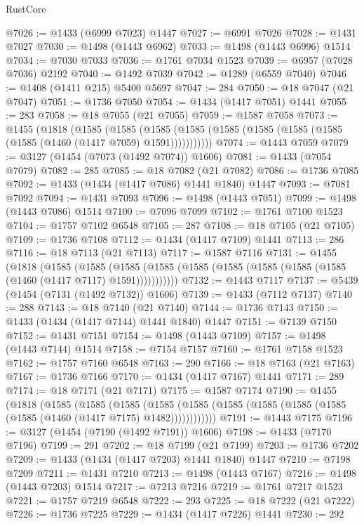 \begin{lexlean}{RustCore}
\begin{coremodule}
@7026 := @1433 (@6999 @7023) @1447
@7027 := @6991 @7026
@7028 := @1431 @7027
@7030 := @1498 (@1443 @6962)
@7033 := @1498 (@1443 @6996) @1514
@7034 := @7030 @7033
@7036 := @1761 @7034 @1523
@7039 := @6957 (@7028 @7036) @2192
@7040 := @1492 @7039
@7042 := @1289 (@6559 @7040)
@7046 := @1408 (@1411 @215) @5400 @5697
@7047 := 284
@7050 := @18 @7047 (@21 @7047)
@7051 := @1736 @7050
@7054 := @1434 (@1417 @7051) @1441
@7055 := 283
@7058 := @18 @7055 (@21 @7055)
@7059 := @1587 @7058
@7073 := @1455
    (@1818
      (@1585
        (@1585
          (@1585 (@1585 (@1585 (@1585 (@1585 (@1585 (@1585 (@1460 (@1417 @7059) @1591)))))))))))
@7074 := @1443 @7059
@7079 := @3127 (@1454 (@7073 (@1492 @7074)) @1606)
@7081 := @1433 (@7054 @7079)
@7082 := 285
@7085 := @18 @7082 (@21 @7082)
@7086 := @1736 @7085
@7092 := @1433 (@1434 (@1417 @7086) @1441 @1840) @1447
@7093 := @7081 @7092
@7094 := @1431 @7093
@7096 := @1498 (@1443 @7051)
@7099 := @1498 (@1443 @7086) @1514
@7100 := @7096 @7099
@7102 := @1761 @7100 @1523
@7104 := @1757 @7102 @6548
@7105 := 287
@7108 := @18 @7105 (@21 @7105)
@7109 := @1736 @7108
@7112 := @1434 (@1417 @7109) @1441
@7113 := 286
@7116 := @18 @7113 (@21 @7113)
@7117 := @1587 @7116
@7131 := @1455
    (@1818
      (@1585
        (@1585
          (@1585 (@1585 (@1585 (@1585 (@1585 (@1585 (@1585 (@1460 (@1417 @7117) @1591)))))))))))
@7132 := @1443 @7117
@7137 := @5439 (@1454 (@7131 (@1492 @7132)) @1606)
@7139 := @1433 (@7112 @7137)
@7140 := 288
@7143 := @18 @7140 (@21 @7140)
@7144 := @1736 @7143
@7150 := @1433 (@1434 (@1417 @7144) @1441 @1840) @1447
@7151 := @7139 @7150
@7152 := @1431 @7151
@7154 := @1498 (@1443 @7109)
@7157 := @1498 (@1443 @7144) @1514
@7158 := @7154 @7157
@7160 := @1761 @7158 @1523
@7162 := @1757 @7160 @6548
@7163 := 290
@7166 := @18 @7163 (@21 @7163)
@7167 := @1736 @7166
@7170 := @1434 (@1417 @7167) @1441
@7171 := 289
@7174 := @18 @7171 (@21 @7171)
@7175 := @1587 @7174
@7190 := @1455
    (@1818
      (@1585
        (@1585
          (@1585
            (@1585 (@1585 (@1585 (@1585 (@1585 (@1585 (@1585 (@1460 (@1417 @7175) @1482))))))))))))
@7191 := @1443 @7175
@7196 := @3127 (@1454 (@7190 (@1492 @7191)) @1606)
@7198 := @1433 (@7170 @7196)
@7199 := 291
@7202 := @18 @7199 (@21 @7199)
@7203 := @1736 @7202
@7209 := @1433 (@1434 (@1417 @7203) @1441 @1840) @1447
@7210 := @7198 @7209
@7211 := @1431 @7210
@7213 := @1498 (@1443 @7167)
@7216 := @1498 (@1443 @7203) @1514
@7217 := @7213 @7216
@7219 := @1761 @7217 @1523
@7221 := @1757 @7219 @6548
@7222 := 293
@7225 := @18 @7222 (@21 @7222)
@7226 := @1736 @7225
@7229 := @1434 (@1417 @7226) @1441
@7230 := 292

\end{coremodule}
\end{lexlean}
